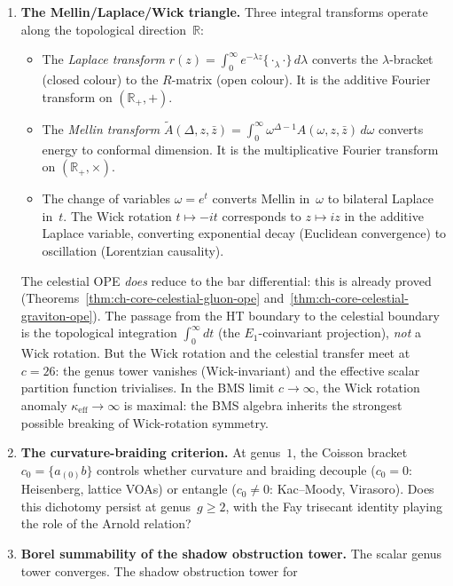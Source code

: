 \documentclass[11pt]{article}
\newcommand{\R}{\mathbb{R}}
\begin{document}
\begin{enumerate}
\item \textbf{The Mellin/Laplace/Wick triangle.}
  Three integral transforms operate along the topological
  direction~$\R$:
  \begin{itemize}
  \item The \emph{Laplace transform}
    $r(z) = \int_0^\infty e^{-\lambda z}
    \{{\cdot}_\lambda{\cdot}\}\,d\lambda$
    converts the $\lambda$-bracket (closed colour) to the
    $R$-matrix (open colour).  It is the additive Fourier
    transform on $(\R_+,{+})$.
  \item The \emph{Mellin transform}
    $\tilde{A}(\Delta,z,\bar z)
    = \int_0^\infty \omega^{\Delta-1}
    A(\omega,z,\bar z)\,d\omega$
    converts energy to conformal dimension.
    It is the multiplicative Fourier transform on
    $(\R_+,{\times})$.
  \item The change of variables $\omega = e^t$ converts
    Mellin in~$\omega$ to bilateral Laplace in~$t$.
    The Wick rotation $t \mapsto -it$ corresponds to
    $z \mapsto iz$ in the additive Laplace variable,
    converting exponential decay (Euclidean convergence)
    to oscillation (Lorentzian causality).
  \end{itemize}
  The celestial OPE \emph{does} reduce to the bar
  differential: this is already proved
  (Theorems~\ref*{thm:ch-core-celestial-gluon-ope}
  and~\ref*{thm:ch-core-celestial-graviton-ope}).
  The passage from the HT boundary to the celestial
  boundary is the topological integration
  $\int_0^\infty dt$ (the $E_1$-coinvariant projection),
  \emph{not} a Wick rotation.  But the Wick rotation and
  the celestial transfer meet at $c = 26$: the genus tower
  vanishes (Wick-invariant) and the effective scalar partition
  function trivialises.  In the BMS limit $c \to \infty$,
  the Wick rotation anomaly $\kappa_{\mathrm{eff}} \to \infty$
  is maximal: the BMS algebra inherits the strongest
  possible breaking of Wick-rotation symmetry.
\item \textbf{The curvature-braiding criterion.}  At genus~$1$,
  the Coisson bracket $c_0 = \{a_{(0)}b\}$ controls whether
  curvature and braiding decouple ($c_0 = 0$: Heisenberg,
  lattice VOAs) or entangle ($c_0 \ne 0$: Kac--Moody, Virasoro).
  Does this dichotomy persist at genus~$g \ge 2$, with the Fay
  trisecant identity playing the role of the Arnold relation?
\item \textbf{Borel summability of the shadow obstruction tower.}
  The scalar genus tower converges.  The shadow obstruction tower for

\end{enumerate}
\end{document}

